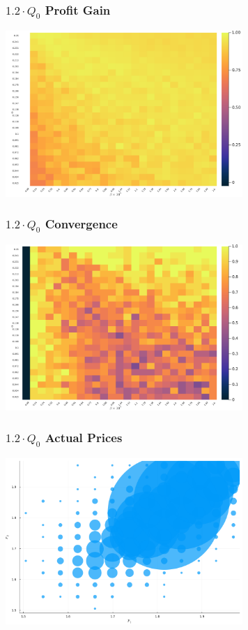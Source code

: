 \documentclass{beamer}
\begin{document}
	\begin{frame}\frametitle{$1.2 \cdot Q_0$ Profit Gain}
\begin{center}
	\includegraphics[width=9cm]{heatmap_profit_gain_small_1.2.png}
\end{center}
\end{frame}
\begin{frame}\frametitle{$1.2 \cdot Q_0$ Convergence}
\begin{center}
	\includegraphics[width=9cm]{heatmap_convergence_counts_small_1.2.png}
\end{center}
\end{frame}
\begin{frame}\frametitle{$1.2 \cdot Q_0$ Actual Prices}
\begin{center}
	\includegraphics[width=9cm]{scatter_plot_prices_small_1.2.png}
\end{center}
\end{frame}




	
\end{document}
